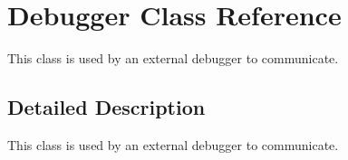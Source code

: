 \hypertarget{class_debugger}{\section{Debugger Class Reference}
\label{class_debugger}
}


This class is used by an external debugger to communicate.  




\subsection{Detailed Description}
This class is used by an external debugger to communicate. 

